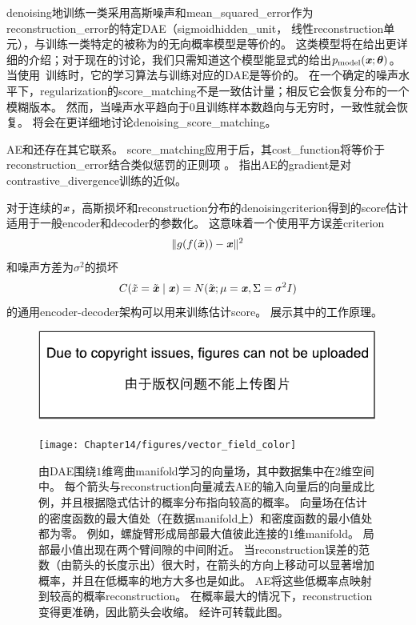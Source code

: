\gls{denoising}地训练一类采用高斯噪声和\gls{mean_squared_error}作为\gls{reconstruction_error}的特定\gls{DAE}（sigmoid\gls{hidden_unit}， 线性\gls{reconstruction}单元），与训练一类特定的被称为的无向概率模型是等价的\citep{Vincent-NC-2011-small}。
这类模型将在给出更详细的介绍；对于现在的讨论，我们只需知道这个模型能显式的给出$p_{\text{model}}(\boldsymbol{\mathit{x}}; \boldsymbol{\theta})$。
当使用~\citep{Kingma+LeCun-2010-small}训练时，它的学习算法与训练对应的\gls{DAE}是等价的。
在一个确定的噪声水平下，\gls{regularization}的\gls{score_matching}不是一致估计量；相反它会恢复分布的一个模糊版本。
然而，当噪声水平趋向于0且训练样本数趋向与无穷时，一致性就会恢复。
将会在更详细地讨论\gls{denoising_score_matching}。


\gls{AE}和还存在其它联系。
\gls{score_matching}应用于后，其\gls{cost_function}将等价于\gls{reconstruction_error}结合类似惩罚的正则项 \citep{Swersky-ICML2011}。
\citet{Bengio+Delalleau-2009}指出\gls{AE}的\gls{gradient}是对\gls{contrastive_divergence}训练的近似。


对于连续的$\boldsymbol{\mathit{x}}$，高斯损坏和\gls{reconstruction}分布的\gls{denoising}\gls{criterion}得到的\gls{score}估计适用于一般\gls{encoder}和\gls{decoder}的参数化\citep{Alain+Bengio-ICLR2013-small}。
这意味着一个使用平方误差\gls{criterion}
\begin{align}
 \| g(f(\tilde {\boldsymbol{\mathit{x}}})) - \boldsymbol{\mathit{x}} \|^2
\end{align}
和噪声方差为$\sigma^2 $的损坏
\begin{align}
 C(\tilde x = \tilde {\boldsymbol{\mathit{x}}} \mid \boldsymbol{\mathit{x}}) = N(\tilde {\boldsymbol{\mathit{x}}}; \mu=\boldsymbol{\mathit{x}}, \Sigma = \sigma^2 I)
\end{align}
的通用\gls{encoder}-\gls{decoder}架构可以用来训练估计\gls{score}。
展示其中的工作原理。

\begin{figure}[!htb]
\ifOpenSource
\centerline{\includegraphics{figure.pdf}}
\else
\centerline{\texttt{[image: Chapter14/figures/vector\_field\_color]}}
\fi
\caption{由\gls{DAE}围绕$1$维弯曲\gls{manifold}学习的向量场，其中数据集中在$2$维空间中。
每个箭头与\gls{reconstruction}向量减去\gls{AE}的输入向量后的向量成比例，并且根据隐式估计的概率分布指向较高的概率。
向量场在估计的密度函数的最大值处（在数据\gls{manifold}上）和密度函数的最小值处都为零。
例如，螺旋臂形成局部最大值彼此连接的$1$维\gls{manifold}。
局部最小值出现在两个臂间隙的中间附近。
当\gls{reconstruction}误差的范数（由箭头的长度示出）很大时，在箭头的方向上移动可以显著增加概率，并且在低概率的地方大多也是如此。
\gls{AE}将这些低概率点映射到较高的概率\gls{reconstruction}。
在概率最大的情况下，\gls{reconstruction}变得更准确，因此箭头会收缩。
经\citet{Alain+Bengio-ICLR2013-small}许可转载此图。
}
\label{fig:chap14_vector_field_color}
\end{figure}

